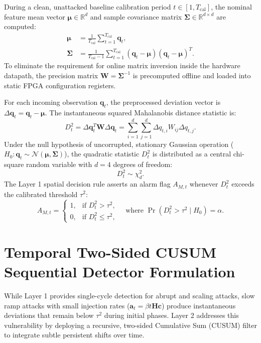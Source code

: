 \documentclass[12pt,a4paper]{report}
\begin{document}
During a clean, unattacked baseline calibration period $t \in [1, T_{\text{cal}}]$, the nominal
feature mean vector $\boldsymbol{\mu} \in \mathbb{R}^d$ and sample covariance matrix
$\boldsymbol{\Sigma} \in \mathbb{R}^{d \times d}$ are computed:
\begin{align}
\boldsymbol{\mu} &= \frac{1}{T_{\text{cal}}} \sum_{t=1}^{T_{\text{cal}}} \boldsymbol{q}_t, \label{eq:ch3_mean_est} \\
\boldsymbol{\Sigma} &= \frac{1}{T_{\text{cal}} - 1} \sum_{t=1}^{T_{\text{cal}}} (\boldsymbol{q}_t - \boldsymbol{\mu})(\boldsymbol{q}_t - \boldsymbol{\mu})^T. \label{eq:ch3_cov_est}
\end{align}
To eliminate the requirement for online matrix inversion inside the hardware datapath, the
precision matrix $\boldsymbol{W} = \boldsymbol{\Sigma}^{-1}$ is precomputed offline and loaded
into static FPGA configuration registers.

For each incoming observation $\boldsymbol{q}_t$, the preprocessed deviation vector is
$\Delta\boldsymbol{q}_t = \boldsymbol{q}_t - \boldsymbol{\mu}$. The instantaneous squared
Mahalanobis distance statistic is:
\begin{equation}
D_t^2 = \Delta\boldsymbol{q}_t^T \boldsymbol{W} \Delta\boldsymbol{q}_t = \sum_{i=1}^d \sum_{j=1}^d \Delta q_{t,i} W_{ij} \Delta q_{t,j}.
\label{eq:ch3_mahal_stat}
\end{equation}
Under the null hypothesis of uncorrupted, stationary Gaussian operation ($H_0: \boldsymbol{q}_t \sim \mathcal{N}(\boldsymbol{\mu}, \boldsymbol{\Sigma})$),
the quadratic statistic $D_t^2$ is distributed as a central chi-square random variable with
$d = 4$ degrees of freedom:
\begin{equation}
D_t^2 \sim \chi^2_d.
\end{equation}
The Layer 1 spatial decision rule asserts an alarm flag $A_{M,t}$ whenever $D_t^2$ exceeds
the calibrated threshold $\tau^2$:
\begin{equation}
A_{M,t} = \begin{cases}
1, & \text{if } D_t^2 > \tau^2, \\
0, & \text{if } D_t^2 \le \tau^2,
\end{cases}
\quad \text{where } \Pr(D_t^2 > \tau^2 \mid H_0) = \alpha.
\label{eq:ch3_layer1_decision}
\end{equation}

\section{Temporal Two-Sided CUSUM Sequential Detector Formulation}
While Layer 1 provides single-cycle detection for abrupt and scaling attacks, slow ramp
attacks with small injection rates ($\boldsymbol{a}_t = \beta t \boldsymbol{H}\boldsymbol{c}$)
produce instantaneous deviations that remain below $\tau^2$ during initial phases.
Layer 2 addresses this vulnerability by deploying a recursive, two-sided Cumulative Sum
(CUSUM) filter to integrate subtle persistent shifts over time.
\end{document}
